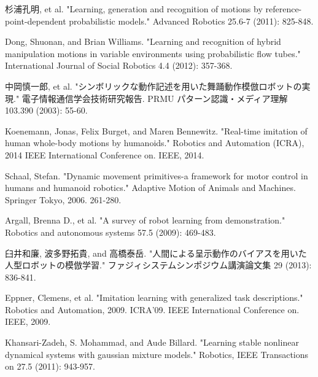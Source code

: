 ﻿%
\begin{thebibliography}{9}%
杉浦孔明, et al. "Learning, generation and recognition of motions by reference-point-dependent probabilistic models." Advanced Robotics 25.6-7 (2011): 825-848.

Dong, Shuonan, and Brian Williams. "Learning and recognition of hybrid manipulation motions in variable environments using probabilistic flow tubes." International Journal of Social Robotics 4.4 (2012): 357-368.

中岡慎一郎, et al. "シンボリックな動作記述を用いた舞踊動作模倣ロボットの実現." 電子情報通信学会技術研究報告. PRMU パターン認識・メディア理解 103.390 (2003): 55-60.

Koenemann, Jonas, Felix Burget, and Maren Bennewitz. "Real-time imitation of human whole-body motions by humanoids." Robotics and Automation (ICRA), 2014 IEEE International Conference on. IEEE, 2014.

Schaal, Stefan. "Dynamic movement primitives-a framework for motor control in humans and humanoid robotics." Adaptive Motion of Animals and Machines. Springer Tokyo, 2006. 261-280.

Argall, Brenna D., et al. "A survey of robot learning from demonstration." Robotics and autonomous systems 57.5 (2009): 469-483.

臼井和廉, 波多野拓貴, and 高橋泰岳. "人間による呈示動作のバイアスを用いた人型ロボットの模倣学習." ファジィシステムシンポジウム講演論文集 29 (2013): 836-841.

Eppner, Clemens, et al. "Imitation learning with generalized task descriptions." Robotics and Automation, 2009. ICRA'09. IEEE International Conference on. IEEE, 2009.

Khansari-Zadeh, S. Mohammad, and Aude Billard. "Learning stable nonlinear dynamical systems with gaussian mixture models." Robotics, IEEE Transactions on 27.5 (2011): 943-957.

\end{thebibliography}


